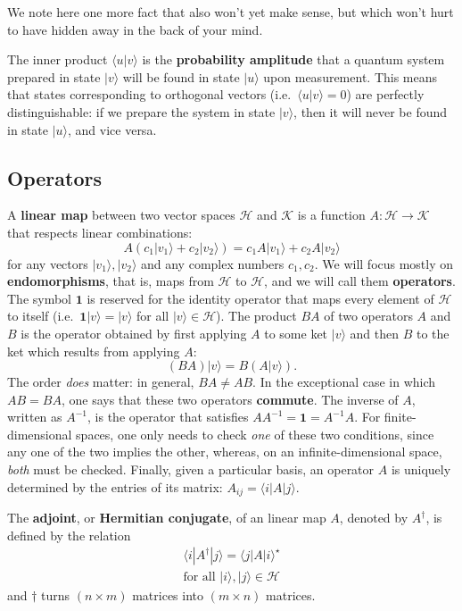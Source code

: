 \documentclass[fleqn]{article}
\newenvironment{idea}{\noindent}{\medskip}
\begin{document}
We note here one more fact that also won't yet make sense, but which won't hurt to have hidden away in the back of your mind.

\begin{idea}
The inner product \(\langle u|v\rangle\) is the \textbf{probability amplitude} that a quantum system prepared in state \(|v\rangle\) will be found in state \(|u\rangle\) upon measurement.
This means that states corresponding to orthogonal vectors (i.e.~\(\langle u|v\rangle=0\)) are perfectly distinguishable: if we prepare the system in state \(|v\rangle\), then it will never be found in state \(|u\rangle\), and vice versa.

\end{idea}

\hypertarget{operators}{%
\subsection{Operators}\label{operators}}

A \textbf{linear map} between two vector spaces \(\mathcal{H}\) and \(\mathcal{K}\) is a function \(A\colon\mathcal{H}\to\mathcal{K}\) that respects linear combinations:
\[
  A(c_1|v_1\rangle+c_2|v_2\rangle)=c_1 A|v_1\rangle+c_2 A|v_2\rangle
\]
for any vectors \(|v_1\rangle,|v_2\rangle\) and any complex numbers \(c_1,c_2\).
We will focus mostly on \textbf{endomorphisms}, that is, maps from \(\mathcal{H}\) to \(\mathcal{H}\), and we will call them \textbf{operators}.
The symbol \(\mathbf{1}\) is reserved for the identity operator that maps every element of \(\mathcal{H}\) to itself (i.e.~\(\mathbf{1}|v\rangle=|v\rangle\) for all \(|v\rangle\in\mathcal{H}\)).
The product \(BA\) of two operators \(A\) and \(B\) is the operator obtained by first applying \(A\) to some ket \(|v\rangle\) and then \(B\) to the ket which results from applying \(A\):
\[
  (BA)|v\rangle = B(A|v\rangle).
\]
The order \emph{does} matter: in general, \(BA\neq AB\).
In the exceptional case in which \(AB=BA\), one says that these two operators \textbf{commute}.
The inverse of \(A\), written as \(A^{-1}\), is the operator that satisfies \(AA^{-1}=\mathbf{1}=A^{-1}A\).
For finite-dimensional spaces, one only needs to check \emph{one} of these two conditions, since any one of the two implies the other, whereas, on an infinite-dimensional space, \emph{both} must be checked.
Finally, given a particular basis, an operator \(A\) is uniquely determined by the entries of its matrix: \(A_{ij}=\langle i|A|j\rangle\).

The \textbf{adjoint}, or \textbf{Hermitian conjugate}, of an linear map \(A\), denoted by \(A^\dagger\), is defined by the relation
\[
  \begin{gathered}
    \langle i|A^\dagger|j\rangle
    = \langle j|A|i\rangle^\star
  \\\text{for all $|i\rangle,|j\rangle\in\mathcal{H}$}
  \end{gathered}
\]
and \(\dagger\) turns \((n\times m)\) matrices into \((m\times n)\) matrices.
\end{document}
